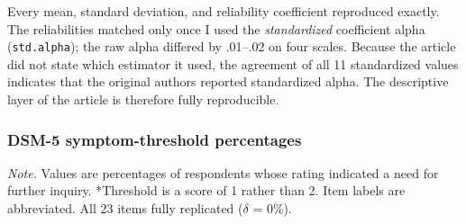 \documentclass[
  english,
  man,floatsintext]{apa6}
\begin{document}
Every mean, standard deviation, and reliability coefficient reproduced exactly. The reliabilities matched only once I used the \emph{standardized} coefficient alpha (\texttt{std.alpha}); the raw alpha differed by .01--.02 on four scales. Because the article did not state which estimator it used, the agreement of all 11 standardized values indicates that the original authors reported standardized alpha. The descriptive layer of the article is therefore fully reproducible.

\subsubsection{DSM-5 symptom-threshold percentages}\label{dsm-5-symptom-threshold-percentages}

\begin{center}
\begin{ThreePartTable}

\begin{TableNotes}[para]
\normalsize{\textit{Note.} Values are percentages of respondents whose rating indicated a need for further inquiry. *Threshold is a score of 1 rather than 2. Item labels are abbreviated. All 23 items fully replicated ($\delta$ = 0\%).}
\end{TableNotes}

\small{

}
\end{ThreePartTable}
\end{center}
\end{document}
